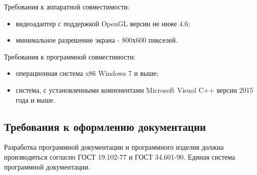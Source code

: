 Требования к аппаратной совместимости:
\begin{itemize}
	\item видеоадаптер с поддержкой OpenGL версии не ниже 4.6;
	\item минимальное разрешение экрана - 800х600 пикселей.
\end{itemize}

Требования к программной совместимости:
\begin{itemize}
	\item операционная система x86 Windows 7 и выше;
	\item система, с установленными компонентами Microsoft Visual C++ версии 2015 года и выше.
\end{itemize}

\subsection{Требования к оформлению документации}

Разработка программной документации и программного изделия должна производиться согласно ГОСТ 19.102-77 и ГОСТ 34.601-90. Единая система программной документации.

